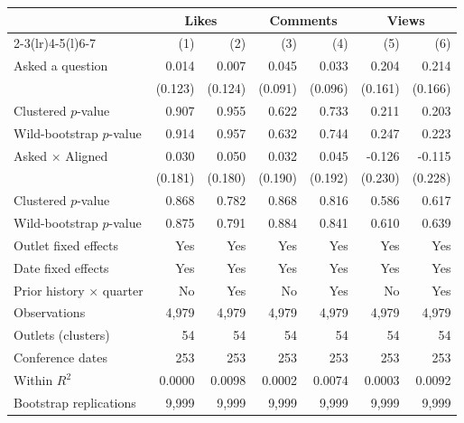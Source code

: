\begingroup\centering\small
\setlength{\tabcolsep}{3pt}
\renewcommand{\arraystretch}{1.05}
\begin{tabular*}{\linewidth}{@{\extracolsep{\fill}}lrrrrrr@{}}
\toprule
 & \multicolumn{2}{c}{Likes} & \multicolumn{2}{c}{Comments} & \multicolumn{2}{c}{Views} \\
\cmidrule(lr){2-3}\cmidrule(lr){4-5}\cmidrule(l){6-7}
 & (1) & (2) & (3) & (4) & (5) & (6) \\
\midrule
Asked a question & 0.014 & 0.007 & 0.045 & 0.033 & 0.204 & 0.214 \\
 & (0.123) & (0.124) & (0.091) & (0.096) & (0.161) & (0.166) \\
Clustered $p$-value & 0.907 & 0.955 & 0.622 & 0.733 & 0.211 & 0.203 \\
Wild-bootstrap $p$-value & 0.914 & 0.957 & 0.632 & 0.744 & 0.247 & 0.223 \\
\addlinespace[5pt]
Asked $\times$ Aligned & 0.030 & 0.050 & 0.032 & 0.045 & -0.126 & -0.115 \\
 & (0.181) & (0.180) & (0.190) & (0.192) & (0.230) & (0.228) \\
Clustered $p$-value & 0.868 & 0.782 & 0.868 & 0.816 & 0.586 & 0.617 \\
Wild-bootstrap $p$-value & 0.875 & 0.791 & 0.884 & 0.841 & 0.610 & 0.639 \\
\midrule
Outlet fixed effects & Yes & Yes & Yes & Yes & Yes & Yes \\
Date fixed effects & Yes & Yes & Yes & Yes & Yes & Yes \\
Prior history $\times$ quarter & No & Yes & No & Yes & No & Yes \\
\addlinespace[3pt]
Observations & 4,979 & 4,979 & 4,979 & 4,979 & 4,979 & 4,979 \\
Outlets (clusters) & 54 & 54 & 54 & 54 & 54 & 54 \\
Conference dates & 253 & 253 & 253 & 253 & 253 & 253 \\
Within $R^2$ & 0.0000 & 0.0098 & 0.0002 & 0.0074 & 0.0003 & 0.0092 \\
Bootstrap replications & 9,999 & 9,999 & 9,999 & 9,999 & 9,999 & 9,999 \\
\bottomrule
\end{tabular*}\par\endgroup
